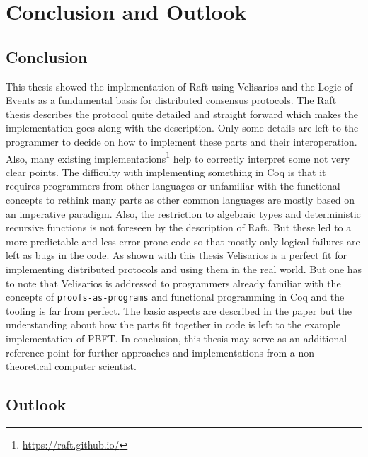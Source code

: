 %
\section{Conclusion and Outlook}
\label{sec_conclusion}


\subsection{Conclusion}

This thesis showed the implementation of Raft using
Velisarios and the Logic of Events as a fundamental
basis for distributed consensus protocols. The Raft
thesis describes the protocol quite detailed and
straight forward which makes the implementation
goes along with the description. Only some details
are left to the programmer to decide on how to implement
these parts and their interoperation. Also, many existing
implementations\footnote{\url{https://raft.github.io/}}
help to correctly interpret some not very clear points.
The difficulty with implementing something in Coq is that
it requires programmers from other languages or unfamiliar
with the functional concepts to rethink many parts
as other common languages are mostly based on an imperative
paradigm. Also, the restriction to algebraic types and deterministic recursive
functions is not foreseen by the description of Raft.
But these led to a more predictable and less error-prone
code so that mostly only logical failures are left as
bugs in the code. As shown with this thesis Velisarios
is a perfect fit for implementing distributed protocols
and using them in the real world. But one has to note that
Velisarios is addressed to programmers already familiar with the
concepts of \texttt{proofs-as-programs} and functional
programming in Coq and the tooling is far from perfect.
The basic aspects are described in the paper but the understanding about how the
parts fit together in code is left to the example
implementation of PBFT. In conclusion, this thesis
may serve as an additional reference point for
further approaches and implementations from a non-theoretical
computer scientist.

\subsection{Outlook}

